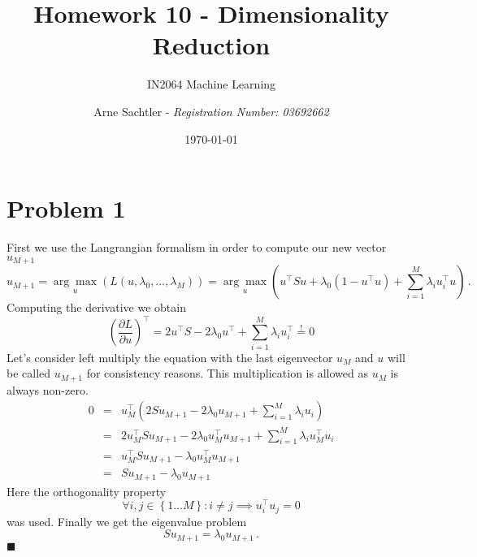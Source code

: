 \documentclass{scrartcl}
\title{Homework 10 - Dimensionality Reduction}
\author{Arne Sachtler - \textit{Registration Number: 03692662}}
\date{\today}
\subtitle{IN2064 Machine Learning}
\newcommand{\qed}{\hfill $\blacksquare$}
\begin{document}
\maketitle

\section{Problem 1} %
\label{sec:problem_1}
First we use the Langrangian formalism in order to compute our new vector $u_{M+1}$
\begin{equation}
	u_{M+1} = \underset{u}{\arg \max}\left(L(u, \lambda_0, \ldots, \lambda_M)\right)=  \underset{u}{\arg \max}\left(  u^\top Su + \lambda_0 (1-u^\top u) +\sum_{i=1}^{M} \lambda_i u_i^\top u \right) \, .
\end{equation}
Computing the derivative we obtain
\begin{equation}
	\left(\frac{\partial L}{\partial u}\right)^\top = 2u^\top S - 2 \lambda_0u^\top + \sum_{i=1}^{M}\lambda_i u_i^\top \overset{!}{=} 0
\end{equation}
Let's consider left multiply the equation with the last eigenvector $u_M$ and $u$ will be called $u_{M+1}$ for consistency reasons.
This multiplication is allowed as $u_M$ is always non-zero.
\begin{eqnarray}
	0 &=& u_M^\top \left(2S u_{M+1} - 2 \lambda_0u_{M+1} + \sum_{i=1}^{M}\lambda_i u_i\right)\\
	&=& 2u_M^\top S u_{M+1} - 2 \lambda_0u_M^\top u_{M+1} + \sum_{i=1}^{M}\lambda_i u_M^\top u_i\\
	&=& u_M^\top S u_{M+1} - \lambda_0 u_M^\top u_{M+1}\\
	&=& S u_{M+1} - \lambda_0u_{M+1}
\end{eqnarray}
Here the orthogonality property
\begin{equation}
	\forall i,j\in\left\{1 \ldots M\right\}: i \neq j \implies u_i^\top u_j = 0
\end{equation}
was used.
Finally we get the eigenvalue problem 
\begin{equation}
	S u_{M+1} = \lambda_0 u_{M+1} \, .
\end{equation}
\qed



\end{document}
